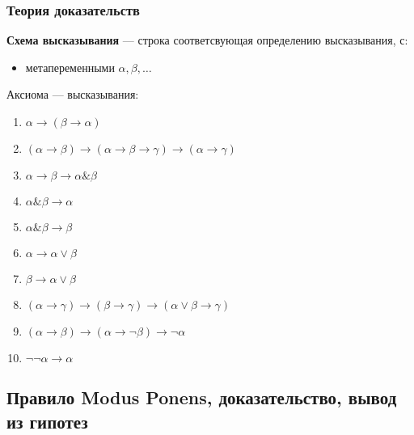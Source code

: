 \documentclass[english]{article}
\begin{document}
\subsubsection{Теория доказательств}
\label{sec:org5ad6dcb}
\begin{definition}
	\textbf{Схема высказывания} --- строка соответсвующая определению высказывания, с:
	\begin{itemize}
		\item метапеременными \(\alpha, \beta, \dots\)
	\end{itemize}
\end{definition}
\begin{definition}
	Аксиома --- высказывания:
	\begin{enumerate}
		\item \(\alpha \to (\beta \to \alpha)\)
		\item \((\alpha \to \beta) \to (\alpha \to \beta \to \gamma) \to (\alpha \to \gamma)\)
		\item \(\alpha \to \beta \to \alpha \& \beta\)
		\item \(\alpha \& \beta \to \alpha\)
		\item \(\alpha \& \beta \to \beta\)
		\item \(\alpha \to \alpha \vee \beta\)
		\item \(\beta \to \alpha \vee \beta\)
		\item \((\alpha \to \gamma) \to (\beta \to \gamma) \to (\alpha \vee \beta \to \gamma)\)
		\item \((\alpha \to \beta) \to (\alpha \to \neg \beta) \to \neg \alpha\)
		\item \(\neg\neg \alpha \to \alpha\)
	\end{enumerate}
\end{definition}
\subsection{Правило Modus Ponens, доказательство, вывод из гипотез}
\label{sec:orgfdaa039}
\end{document}
